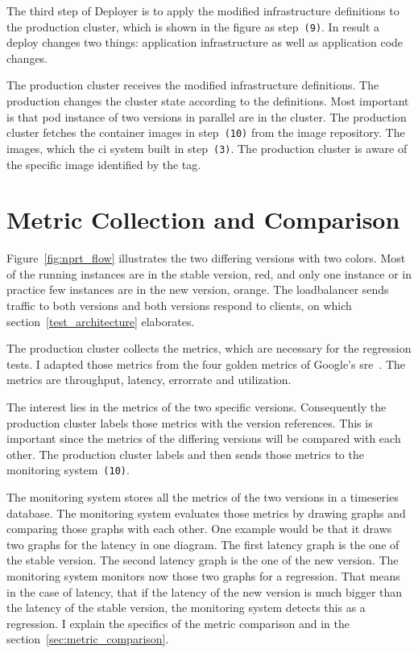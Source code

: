 The third step of Deployer is to apply the modified infrastructure definitions to the
production cluster, which is shown in the figure as step~\texttt{(9)}. In result a deploy
changes two things: application infrastructure as well as application code changes.

The production cluster receives the modified infrastructure definitions. The production
changes the cluster state according to the definitions. Most important is that pod
instance of two versions in parallel are in the cluster. The production cluster fetches
the container images in step~\texttt{(10)} from the image repository. The images, which
the \gls{ci} system built in step~\texttt{(3)}. The production cluster is aware of the
specific image identified by the tag.

\section{Metric Collection and Comparison}

Figure~\ref{fig:nprt_flow} illustrates the two differing versions with two colors. Most of
the running instances are in the stable version, red, and only one instance or in practice
few instances are in the new version, orange. The loadbalancer sends traffic to both
versions and both versions respond to clients, on which section~\ref{test_architecture}
elaborates.

The production cluster collects the metrics, which are necessary for the regression tests.
I adapted those metrics from the four golden metrics of Google's
\gls{sre}~\cite{sre_monitoring}. The metrics are throughput, latency, errorrate and
utilization.

The interest lies in the metrics of the two specific versions. Consequently the production
cluster labels those metrics with the version references. This is important since the
metrics of the differing versions will be compared with each other. The production cluster
labels and then sends those metrics to the monitoring system~\texttt{(10)}.

The monitoring system stores all the metrics of the two versions in a timeseries
database. The monitoring system evaluates those metrics by drawing graphs and comparing
those graphs with each other. One example would be that it draws two graphs for the
latency in one diagram. The first latency graph is the one of the stable version. The
second latency graph is the one of the new version. The monitoring system monitors now
those two graphs for a regression. That means in the case of latency, that if the latency
of the new version is much bigger than the latency of the stable version, the monitoring
system detects this as a regression. I explain the specifics of the metric comparison and
in the section~\ref{sec:metric_comparison}.

